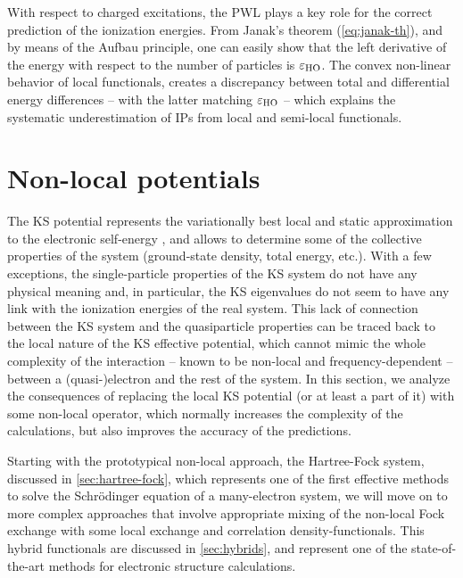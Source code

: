 With respect to charged excitations, the PWL plays a key role for the correct prediction of the ionization energies. From Janak's theorem (\cref{eq:janak-th}), and by means of the Aufbau principle, one can easily show that the left derivative of the energy with respect to the number of particles is $\varepsilon_{\rm HO}$. The convex non-linear behavior of local functionals, creates a discrepancy between total and differential energy differences -- with the latter matching $\varepsilon_{\rm HO}$ -- which explains the systematic underestimation of IPs from local and semi-local functionals.

\section{Non-local potentials\label{sec:non-local}}
The KS potential represents the variationally best local and static approximation to the electronic self-energy \cite{casida_generalization_1995}, and allows to determine some of the collective properties of the system (ground-state density, total energy, etc.). With a few exceptions, the single-particle properties of the KS system do not have any physical meaning and, in particular, the KS eigenvalues do not seem to have any link with the ionization energies of the real system. This lack of connection between the KS system and the quasiparticle properties can be traced back to the local nature of the KS effective potential, which cannot mimic the whole complexity of the interaction -- known to be non-local and frequency-dependent -- between a (quasi-)electron and the rest of the system. In this section, we analyze the consequences of replacing the local KS potential (or at least a part of it) with some non-local operator, which normally increases the complexity of the calculations, but also improves the accuracy of the predictions.

Starting with the prototypical non-local approach, the Hartree-Fock system, discussed in \cref{sec:hartree-fock}, which represents one of the first effective methods to solve the Schr\"{o}dinger equation of a many-electron system, we will move on to more complex approaches that involve appropriate mixing of the non-local Fock exchange with some local exchange and correlation density-functionals. This hybrid functionals are discussed in \cref{sec:hybrids}, and represent one of the state-of-the-art methods for electronic structure calculations.

